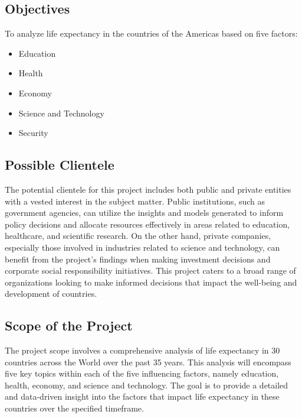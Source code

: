 \documentclass{other/docTemplate}
\begin{document}
\subsection{Objectives}
To analyze life expectancy in the countries of the Americas based on five factors: 
\begin{itemize}
  \item Education
  \item Health
  \item Economy
  \item Science and Technology
  \item Security
\end{itemize}

\subsection{Possible Clientele}
The potential clientele for this project includes both public and private entities with a vested interest in the subject matter. Public institutions, such as government agencies, can utilize the insights and models generated to inform policy decisions and allocate resources effectively in areas related to education, healthcare, and scientific research. On the other hand, private companies, especially those involved in industries related to science and technology, can benefit from the project's findings when making investment decisions and corporate social responsibility initiatives. This project caters to a broad range of organizations looking to make informed decisions that impact the well-being and development of countries.

\subsection{Scope of the Project}
The project scope involves a comprehensive analysis of life expectancy in 30 countries across the World over the past 35 years. This analysis will encompass five key topics within each of the five influencing factors, namely education, health, economy, and science and technology. The goal is to provide a detailed and data-driven insight into the factors that impact life expectancy in these countries over the specified timeframe.



\clearpage
\end{document}
